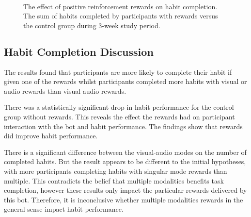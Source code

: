 \documentclass{scaffold/sigchi}
\begin{document}
\begin{figure}
  \centering
  \caption{The effect of positive reinforcement rewards on habit completion. The sum of habits completed by participants with rewards versus the control group during 3-week study period.}~\label{fig:m1_h1}
\end{figure}


\subsection{Habit Completion Discussion}
The results found that participants are more likely to complete their habit if given one of the rewards whilst participants completed more habits with visual or audio rewards than visual-audio rewards.

There was a statistically significant drop in habit performance for the control group without rewards. This reveals the effect the rewards had on participant interaction with the bot and habit performance. The findings show that rewards did improve habit performance.

There is a significant difference between the visual-audio modes on the number of completed habits. But the result appears to be different to the initial hypotheses, with more participants completing habits with singular mode rewards than multiple. This contradicts the belief that multiple modalities benefits task completion, however these results only impact the particular rewards delivered by this bot. Therefore, it is inconclusive whether multiple modalities rewards in the general sense impact habit performance.
\end{document}
